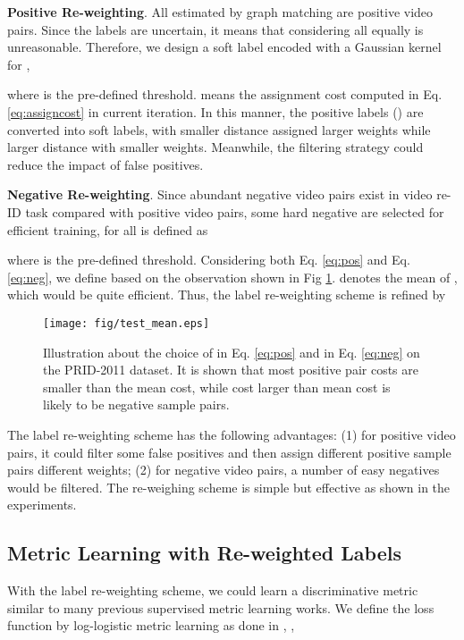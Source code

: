 \documentclass[10pt,twocolumn,letterpaper]{article}
\begin{document}
\textbf{Positive Re-weighting}. All  estimated by graph matching are positive video pairs. Since the labels are uncertain, it means that considering all  equally is unreasonable. Therefore, we design a soft label  encoded with a Gaussian kernel for ,

where  is the pre-defined threshold.  means the assignment cost computed in Eq. \ref{eq:assigncost} in current iteration. In this manner, the positive labels () are converted into soft labels, with smaller distance assigned larger weights while larger distance with smaller weights. Meanwhile, the filtering strategy could reduce the impact of false positives.

\textbf{Negative Re-weighting}. Since abundant negative video pairs exist in video re-ID task compared with positive video pairs, some hard negative are selected for efficient training,  for all  is defined as

where  is the pre-defined threshold. Considering both Eq. \ref{eq:pos} and Eq. \ref{eq:neg}, we define  based on the observation shown in Fig \ref{fig:mean}.  denotes the mean of , which would be quite efficient. Thus, the label re-weighting scheme is refined by

\begin{figure}[t]
  \centering
  \texttt{[image: fig/test\_mean.eps]}\\
  \caption{\small{Illustration about the choice of  in Eq. \ref{eq:pos} and  in Eq. \ref{eq:neg} on the PRID-2011 dataset. It is shown that most positive pair costs are smaller than the mean cost, while cost larger than mean cost is likely to be negative sample pairs. }}\label{fig:mean}
\end{figure}
The label re-weighting scheme has the following advantages: (1) for positive video pairs, it could filter some false positives and then assign different positive sample pairs different weights; (2) for negative video pairs, a number of easy negatives would be filtered. The re-weighing scheme is simple but effective as shown in the experiments.

\subsection{Metric Learning with Re-weighted Labels}
With the label re-weighting scheme, we could learn a discriminative metric similar to many previous supervised metric learning works. We define the loss function by log-logistic metric learning as done in \cite{iccv15liao}, \ie,
\end{document}
